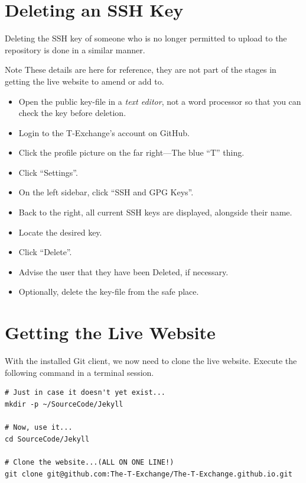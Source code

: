 \section{Deleting an SSH Key}

Deleting the SSH key of someone who is no longer permitted to upload to the repository is done in a similar manner.

\begin{tips}{Note}
    These details are here for reference, they are not part of the stages in getting the live website to amend or add to.
\end{tips}

\begin{itemize}
    \item Open the public key-file in a \emph{text editor}, not a word processor so that you can check the key before deletion.
    \item Login to the T-Exchange's account on GitHub.
    \item Click the profile picture on the far right---The blue ``T'' thing.
    \item Click ``Settings''.
    \item On the left sidebar, click ``SSH and GPG Keys''.
    \item Back to the right, all current SSH keys are displayed, alongside their name.
    \item Locate the desired key.
    \item Click ``Delete''.
    \item Advise the user that they have been Deleted, if necessary.
    \item Optionally, delete the key-file from the safe place.
\end{itemize}

\section{Getting the Live Website}

With  the installed Git client, we now need to clone the live website. Execute the following command in a terminal session.

\begin{lstlisting}[style=myText]
# Just in case it doesn't yet exist...
mkdir -p ~/SourceCode/Jekyll

# Now, use it...
cd SourceCode/Jekyll

# Clone the website...(ALL ON ONE LINE!)
git clone git@github.com:The-T-Exchange/The-T-Exchange.github.io.git
\end{lstlisting}

